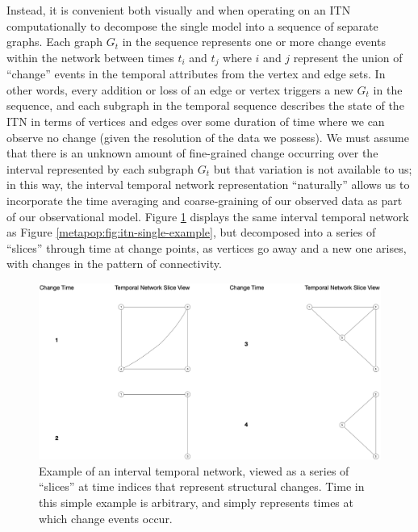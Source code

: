     Instead, it is convenient both visually and when operating on an ITN computationally to decompose the single model into a sequence of separate graphs.  Each graph \(G_t\) in the sequence represents one
    or more change events within the network between times \(t_i\) and
    \(t_j\) where \(i\) and \(j\) represent the union of ``change'' events in the temporal attributes from the vertex and edge sets.  In other words, every addition or loss of an edge or vertex triggers a new \(G_t\) in the sequence, and each subgraph in the temporal sequence describes the state of the ITN in terms of vertices and edges over some duration of time where we can observe no change (given the resolution of the data we possess).  We must assume that there is an unknown amount of fine-grained change occurring over the interval represented by each subgraph \(G_t\) but that variation is not available to us; in this way, the interval temporal network representation ``naturally'' allows us to incorporate the time averaging and coarse-graining of our observed data as part of our observational model.  Figure \ref{metapop:fig:itn-sliced-example} displays the same interval temporal network as Figure \ref{metapop:fig:itn-single-example}, but decomposed into a series of ``slices'' through time at change points, as vertices go away and a new one arises, with changes in the pattern of connectivity.
    
    \begin{figure}[ht]
    \centering
    \includegraphics[scale=0.20]{graphics/multipleseriation/interval-temporal-network-sliced-view.png}
    \caption{Example of an interval temporal network, viewed as a series of ``slices'' at time indices that represent structural changes.  Time in this simple example is arbitrary, and simply represents times at which change events occur.}
    \label{metapop:fig:itn-sliced-example}
    \end{figure}
    
